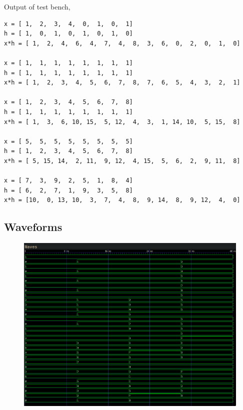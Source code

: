 \documentclass{article}
\begin{document}
Output of test bench, 
\begin{lstlisting}[style = style]
x = [ 1,  2,  3,  4,  0,  1,  0,  1]
h = [ 1,  0,  1,  0,  1,  0,  1,  0]
x*h = [ 1,  2,  4,  6,  4,  7,  4,  8,  3,  6,  0,  2,  0,  1,  0]

x = [ 1,  1,  1,  1,  1,  1,  1,  1]
h = [ 1,  1,  1,  1,  1,  1,  1,  1]
x*h = [ 1,  2,  3,  4,  5,  6,  7,  8,  7,  6,  5,  4,  3,  2,  1]

x = [ 1,  2,  3,  4,  5,  6,  7,  8]
h = [ 1,  1,  1,  1,  1,  1,  1,  1]
x*h = [ 1,  3,  6, 10, 15,  5, 12,  4,  3,  1, 14, 10,  5, 15,  8]

x = [ 5,  5,  5,  5,  5,  5,  5,  5]
h = [ 1,  2,  3,  4,  5,  6,  7,  8]
x*h = [ 5, 15, 14,  2, 11,  9, 12,  4, 15,  5,  6,  2,  9, 11,  8]

x = [ 7,  3,  9,  2,  5,  1,  8,  4]
h = [ 6,  2,  7,  1,  9,  3,  5,  8]
x*h = [10,  0, 13, 10,  3,  7,  4,  8,  9, 14,  8,  9, 12,  4,  0]
\end{lstlisting}
\pagebreak
\subsection*{Waveforms}
\begin{figure}[h!]
    \centering
    \includegraphics[width=1\linewidth]{figs/waveform_1.png}
    \label{fig:enter-label}
\end{figure}
\end{document}
